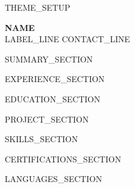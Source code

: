 \documentclass[letterpaper,11pt]{article}
\begin{document}
{{THEME_SETUP}}


\begin{center}
    \textbf{\Huge \scshape {{NAME}}} \\ \vspace{1pt}
    {{LABEL_LINE}}
    \small {{CONTACT_LINE}}
\end{center}

{{SUMMARY_SECTION}}

{{EXPERIENCE_SECTION}}

{{EDUCATION_SECTION}}

{{PROJECT_SECTION}}

{{SKILLS_SECTION}}

{{CERTIFICATIONS_SECTION}}

{{LANGUAGES_SECTION}}
\end{document}
